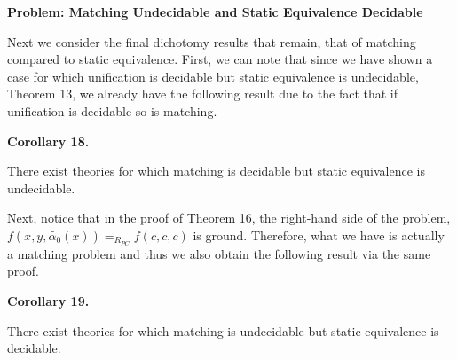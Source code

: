 \documentclass[10pt,a4paper]{amsart}
\begin{document}
 
 
 
 
 
\par\medskip\noindent\textbf{Problem: Matching Undecidable and Static Equivalence Decidable}\par
 
 
Next we consider the final dichotomy results that remain, that of matching compared to static equivalence. First, we can note that since we have shown a case for which unification is decidable but static equivalence is undecidable, Theorem 13, we already have the following result due to the fact that if unification is decidable so is matching.\par
 
 
 
\par\medskip\noindent\textbf{Corollary 18.}\par
 
 
There exist theories for which matching is decidable but static equivalence is undecidable.\par
 
 
 
 
Next, notice that in the proof of Theorem 16, the right-hand side of the problem, $f(x,y,\widetilde{\alpha_{0}}(x))=_{R_{PC}}f(c,c,c)$ is ground. Therefore, what we have is actually a matching problem and thus we also obtain the following result via the same proof.\par
 
 
 
\par\medskip\noindent\textbf{Corollary 19.}\par
 
 
There exist theories for which matching is undecidable but static equivalence is decidable.\par
 
\end{document}
